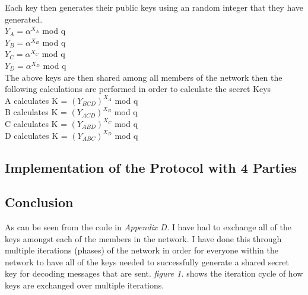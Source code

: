 \documentclass[a4paper, twoside, 11pt]{article}
\begin{document}
Each key then generates their public keys using an random integer that they have generated. \\
$Y_A = \alpha^{X_A}$ mod q \\
$Y_B = \alpha^{X_B}$ mod q \\
$Y_C = \alpha^{X_C}$ mod q \\
$Y_D = \alpha^{X_D}$ mod q \\

The above keys are then shared among all members of the network
then the following calculations are performed in order to calculate the secret Keys\\
A calculates K = $(Y_{BCD})^{X_A}$ mod q \\
B calculates K = $(Y_{ACD})^{X_B}$ mod q \\
C calculates K = $(Y_{ABD})^{X_C}$ mod q \\
D calculates K = $(Y_{ABC})^{X_D}$ mod q \\




\subsection{Implementation of the Protocol with 4 Parties}
\subsection{Conclusion}
As can be seen from the code in \textit{Appendix D. }I have had to exchange all of the keys amongst each of the members in the network. I have done this through multiple iterations (phases) of the network in order
for everyone within the network to have all of the keys needed to successfully generate a shared secret key for decoding messages that are sent. 
\textit{figure 1.} shows the iteration cycle of how keys are exchanged over multiple iterations.
\end{document}
